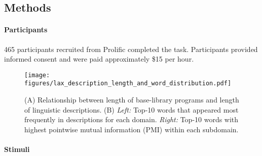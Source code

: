 \subsection{Methods}

\paragraph{Participants}
465 participants recruited from Prolific completed the task. 
Participants provided informed consent and were paid approximately \$15 per hour. %

\begin{figure*}[ht!]
  \begin{center}
  \texttt{[image: figures/lax\_description\_length\_and\_word\_distribution.pdf]}
  \caption{(A) Relationship between length of base-library programs and length of linguistic descriptions. (B) \textit{Left:} Top-10 words that appeared most frequently in descriptions for each domain. \textit{Right:} Top-10 words with highest pointwise mutual information (PMI) within each subdomain.}
  \label{fig:words}
  \end{center}
\end{figure*}

\paragraph{Stimuli} 



